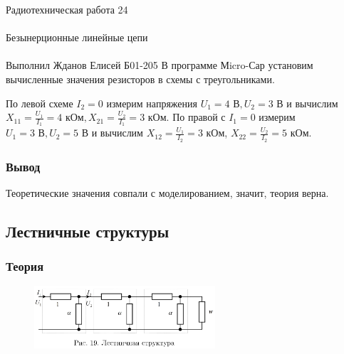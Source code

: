 \documentclass{astroedu-lab}
\begin{document}
\begin{problem}{\huge Радиотехническая работа 24\\\\Безынерционные линейные цепи\\\\Выполнил Жданов Елисей Б01-205}
В программе Мicro-Сар установим вычисленные значения резисторов в схемы с треугольниками.

По левой схеме $I_2=0$ измерим напряжения $U_1 = 4 \text{ В}, U_2 = 3 \text{ В}$ и вычислим $X_{11}=\frac{U_1}{I_1} = 4 \text{ кОм}, X_{21}=\frac{U_2}{I_1} = 3 \text{ кОм}$. По правой с $I_1=0$ измерим $U_1 = 3 \text{ В}, U_2 = 5 \text{ В}$ и вычислим $X_{12}=\frac{U_1}{I_2} = 3 \text{ кОм}$, $X_{22}=\frac{U_2}{I_2} = 5 \text{ кОм}$.

\subsubsection{Вывод}

Теоретические значения совпали с моделированием, значит, теория верна.

\subsection{Лестничные структуры}

\subsubsection{Теория}

\begin{figure}[!h]
	\centering
	\includegraphics[width=0.6\textwidth]{19.png}
	\label{fig:boiler}
\end{figure}


\end{problem}
\end{document}

